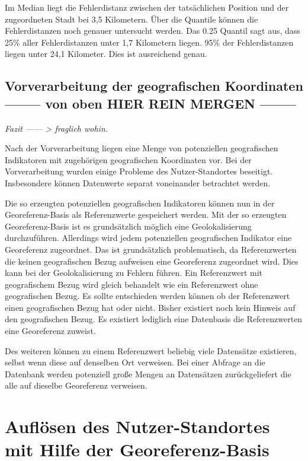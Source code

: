 					Im Median liegt die Fehlerdistanz zwischen der tatsächlichen Position und der zugeordneten Stadt bei 3,5 Kilometern.
					Über die Quantile können die Fehlerdistanzen noch genauer untersucht werden.
					Das 0.25 Quantil sagt aus, dass 25\% aller Fehlerdistanzen unter 1,7 Kilometern liegen.
					95\% der Fehlerdistanzen liegen unter 24,1 Kilometer. 
					Dies ist ausreichend genau. 

		\subsection{Vorverarbeitung der geografischen Koordinaten -------- von oben HIER REIN MERGEN --------}  

			\textit{Fazit ------ > fraglich wohin.} 


				Nach der Vorverarbeitung liegen eine Menge von potenziellen geografischen Indikatoren mit zugehörigen geografischen Koordinaten vor.
				Bei der Vorverarbeitung wurden einige Probleme des Nutzer-Standortes beseitigt.
				Insbesondere können Datenwerte separat voneinander betrachtet werden.

				Die so erzeugten potenziellen geografischen Indikatoren können nun in der Georeferenz-Basis als Referenzwerte gespeichert werden.
				Mit der so erzeugten Georeferenz-Basis ist es grundsätzlich möglich eine Geolokalisierung durchzuführen. 
				Allerdings wird jedem potenziellen geografischen Indikator eine Georeferenz zugeordnet.
				Das ist grundsätzlich problematisch, da Referenzwerten die keinen geografischen Bezug aufweisen eine Georeferenz zugeordnet wird. 
				Dies kann bei der Geolokalisierung zu Fehlern führen.
				Ein Referenzwert mit geografischem Bezug wird gleich behandelt wie ein Referenzwert ohne geografischen Bezug.
				Es sollte entschieden werden können ob der Referenzwert einen geografischen Bezug hat oder nicht.
				Bisher existiert noch kein Hinweis auf den geografischen Bezug.
				Es existiert lediglich eine Datenbasis die Referenzwerten eine Georeferenz zuweist. 

				Des weiteren können zu einem Referenzwert beliebig viele Datensätze existieren, selbst wenn diese auf denselben Ort verweisen. 
				Bei einer Abfrage an die Datenbank werden potenziell große Mengen an Datensätzen zurückgeliefert die alle auf dieselbe Georeferenz verweisen.

	\section{Auflösen des Nutzer-Standortes mit Hilfe der Georeferenz-Basis} \label{sec:AufloesenDesNutzerStandortes} 

